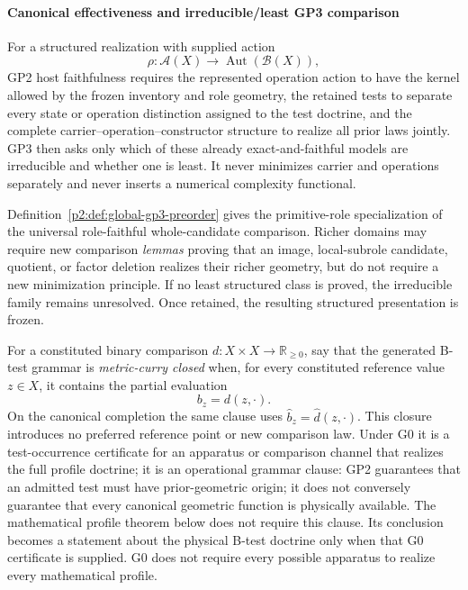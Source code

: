 \documentclass[12pt,a4paper]{article}
\begin{document}
\paragraph{Canonical effectiveness and irreducible/least GP3 comparison}

\begin{remark}
\label{p2:rem:gp3-faithful-reduction-alone}
For a structured realization with supplied action
\[
 \rho:\mathcal A(X)\longrightarrow\operatorname{Aut}(\mathcal B(X)),
\]
GP2 host faithfulness requires the represented operation action to have the
kernel allowed by the frozen inventory and role geometry, the retained tests
to separate every state or operation distinction assigned to the test doctrine,
and the complete
carrier--operation--constructor structure to realize all prior laws jointly.
GP3 then asks only which of these already exact-and-faithful models are
irreducible and whether one is least.  It never minimizes carrier and
operations separately and never inserts a numerical complexity functional.

Definition~\ref{p2:def:global-gp3-preorder} gives the primitive-role
specialization of the universal role-faithful whole-candidate comparison.
Richer domains may require new comparison \emph{lemmas} proving that an image,
local-subrole candidate, quotient, or factor deletion realizes their richer
geometry, but do not require a new minimization principle.  If no least structured class is
proved, the irreducible family remains unresolved.  Once retained, the
resulting structured presentation is frozen.
\end{remark}

\begin{definition}
\label{p2:def:metric-partial-evaluation-closure}
For a constituted binary comparison \(d:X\times X\to\mathbb R_{\ge0}\), say
that the generated B-test grammar is \emph{metric-curry closed} when, for
every constituted reference value \(z\in X\), it contains the partial
evaluation
\[
        b_z=d(z,\cdot).
\]
On the canonical completion the same clause uses
\(\widehat b_z=\widehat d(z,\cdot)\).  This closure introduces no preferred
reference point or new comparison law.  Under G0 it is a test-occurrence
certificate for an apparatus or comparison channel that realizes the full
profile doctrine; it is an operational grammar
clause: GP2 guarantees that an admitted test must have prior-geometric
origin; it does not conversely guarantee that every canonical geometric
function is physically available.  The mathematical profile theorem below
does not require this clause.  Its conclusion becomes a statement about the
physical B-test doctrine only when that G0 certificate is supplied.  G0 does
not require every possible apparatus to realize every mathematical profile.
\end{definition}
\end{document}
